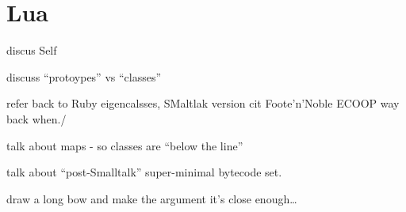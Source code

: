 \section{Lua}


discus Self

discuss ``protoypes'' vs ``classes''

refer back to Ruby eigencalsses,
SMaltlak version cit Foote'n'Noble ECOOP way back when./

talk about maps - so classes are ``below the line''

talk about ``post-Smalltalk'' super-minimal bytecode set.

draw a long bow and make the argument it's close enough\ldots
